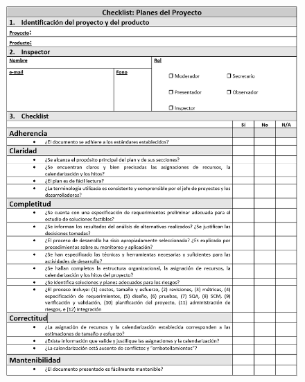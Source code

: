 \begin{figure}[H]
\centering
\includegraphics[width=1\textwidth]{figures/anexos/3-2-2.PNG}
\end{figure}

